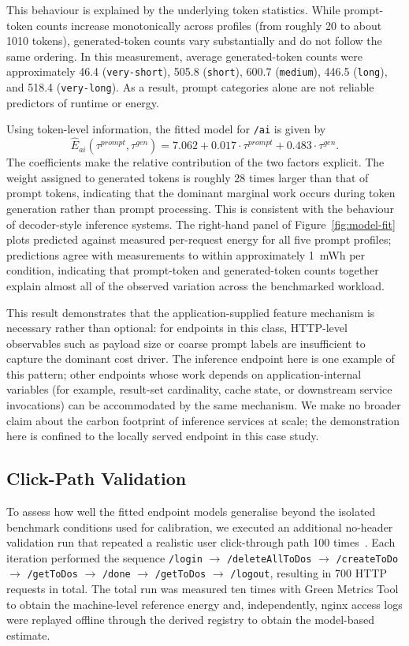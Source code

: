 \documentclass[sigconf]{acmart}
\begin{document}
This behaviour is explained by the underlying token statistics. While prompt-token counts increase monotonically across profiles (from roughly 20 to about 1010 tokens), generated-token counts vary substantially and do not follow the same ordering. In this measurement, average generated-token counts were approximately 46.4 (\texttt{very-short}), 505.8 (\texttt{short}), 600.7 (\texttt{medium}), 446.5 (\texttt{long}), and 518.4 (\texttt{very-long}). As a result, prompt categories alone are not reliable predictors of runtime or energy.

Using token-level information, the fitted model for \texttt{/ai} is given by
\[
\widehat{E}_{ai}(\tau^{prompt}, \tau^{gen}) =
7.062 + 0.017 \cdot \tau^{prompt} + 0.483 \cdot \tau^{gen}.
\]
The coefficients make the relative contribution of the two factors explicit. The weight assigned to generated tokens is roughly 28 times larger than that of prompt tokens, indicating that the dominant marginal work occurs during token generation rather than prompt processing. This is consistent with the behaviour of decoder-style inference systems. The right-hand panel of Figure~\ref{fig:model-fit} plots predicted against measured per-request energy for all five prompt profiles; predictions agree with measurements to within approximately \SI{1}{mWh} per condition, indicating that prompt-token and generated-token counts together explain almost all of the observed variation across the benchmarked workload.

This result demonstrates that the application-supplied feature mechanism is necessary rather than optional: for endpoints in this class, HTTP-level observables such as payload size or coarse prompt labels are insufficient to capture the dominant cost driver. The inference endpoint here is one example of this pattern; other endpoints whose work depends on application-internal variables (for example, result-set cardinality, cache state, or downstream service invocations) can be accommodated by the same mechanism. We make no broader claim about the carbon footprint of inference services at scale; the demonstration here is confined to the locally served endpoint in this case study.

\subsection{Click-Path Validation}
To assess how well the fitted endpoint models generalise beyond the isolated benchmark conditions used for calibration, we executed an additional no-header validation run that repeated a realistic user click-through path 100 times~\cite{gmt-run-validation-walkthrough}. Each iteration performed the sequence \texttt{/login} \(\rightarrow\) \texttt{/deleteAllToDos} \(\rightarrow\) \texttt{/createToDo} \(\rightarrow\) \texttt{/getToDos} \(\rightarrow\) \texttt{/done} \(\rightarrow\) \texttt{/getToDos} \(\rightarrow\) \texttt{/logout}, resulting in 700 HTTP requests in total. The total run was measured ten times with Green Metrics Tool to obtain the machine-level reference energy and, independently, nginx access logs were replayed offline through the derived registry to obtain the model-based estimate.
\end{document}
